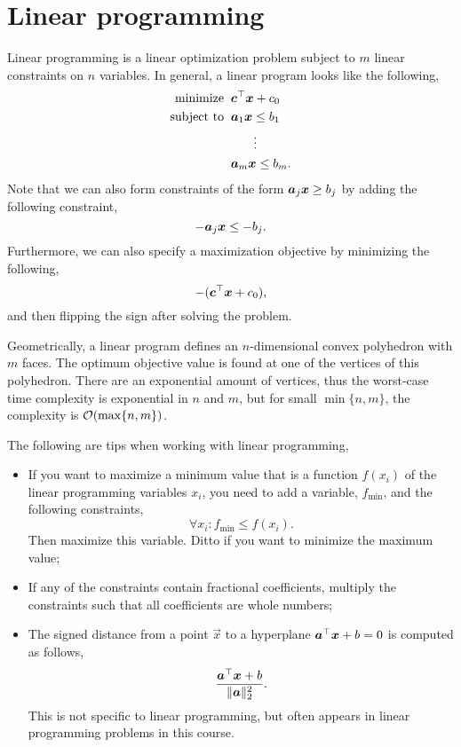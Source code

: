 \documentclass[justified,nobib]{tufte-handout}
\begin{document}
\section{Linear programming}


Linear programming is a linear optimization problem subject to $m$ linear constraints on $n$
variables. In general, a linear program looks like the following,
\begin{align*}
    \text{minimize} \;\;   & \transpose{\vec{c}} \vec{x} + c_0        \\
    \text{subject to} \;\; & \mat{a}_1 \vec{x} \leq b_1               \\
                           & \vdotswithin{\mat{a}_1 \vec{x} \leq b_1} \\
                           & \mat{a}_m \vec{x} \leq b_m.
\end{align*}
Note that we can also form constraints of the form $\bm{a}_j \bm{x} \geq b_j$
by adding the following constraint, \[
    -\bm{a}_j \bm{x} \leq -b_j.
\]
Furthermore, we can also specify a maximization objective by minimizing the following, \[
    -(\bm{c}^\top \bm{x} + c_0),
\]
and then flipping the sign after solving the problem.

Geometrically, a linear program defines an $n$-dimensional convex polyhedron with $m$ faces. The
optimum objective value is found at one of the vertices of this polyhedron. There are an
exponential amount of vertices, thus the worst-case time complexity is exponential in $n$ and $m$,
but for small $\min \{ n,m \}$, the complexity is $\bigo{\max\{ n,m \}}$.

The following are tips when working with linear programming,
\begin{itemize}
    \item If you want to maximize a minimum value that is a function $f(x_i)$ of the linear programming
          variables $x_i$, you need to add a variable, $f_{\min}$, and the following constraints, \[
              \forall x_i : f_{\min} \leq f(x_i).
          \]
          Then maximize this variable. Ditto if you want to minimize the maximum value;

    \item If any of the constraints contain fractional coefficients, multiply the constraints such that all
          coefficients are whole numbers;

    \item The signed distance from a point $\vec{x}$ to a hyperplane $\bm{a}^\top\bm{x} + b = 0$ is
          computed as follows, \[
              \frac{\bm{a}^\top\bm{x} + b}{\lVert \bm{a} \rVert_2^2}.
          \]
          This is not specific to linear programming, but often appears in linear programming problems in
          this course.
\end{itemize}
\end{document}
